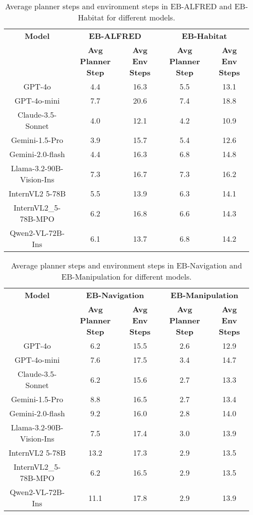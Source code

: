 \begin{table}[th]
    \centering
    \renewcommand{\arraystretch}{1.2}  %
    \begin{tabular}{c|cccc}  
    \toprule
    \textbf{Model} & \multicolumn{2}{c}{\textbf{EB-ALFRED}} & \multicolumn{2}{c}{\textbf{EB-Habitat}} \\
    \cmidrule(lr){2-5} 
    & \textbf{Avg Planner Step} & \textbf{Avg Env Steps} & \textbf{Avg Planner Step} & \textbf{Avg Env Steps} \\
    \midrule
    GPT-4o  & 4.4  & 16.3 & 5.5 & 13.1 \\
    GPT-4o-mini & 7.7  & 20.6 & 7.4 & 18.8 \\
    Claude-3.5-Sonnet  & 4.0  & 12.1 & 4.2 & 10.9 \\
    Gemini-1.5-Pro & 3.9  & 15.7  &  5.4 & 12.6 \\
    Gemini-2.0-flash & 4.4  & 16.3 & 6.8 & 14.8 \\
    Llama-3.2-90B-Vision-Ins & 7.3  & 16.7 & 7.3 & 16.2 \\
    InternVL2 5-78B & 5.5  & 13.9 & 6.3 & 14.1 \\
    InternVL2\_5-78B-MPO & 6.2 & 16.8 & 6.6 & 14.3 \\
    Qwen2-VL-72B-Ins & 6.1  & 13.7 & 6.8  & 14.2  \\
    \bottomrule
    \end{tabular}
    \caption{Average planner steps and environment steps in EB-ALFRED and EB-Habitat for different models.}
    \label{tab:high_env_steps}
\end{table}

\begin{table}[th]
    \centering
    \renewcommand{\arraystretch}{1.2}  %
    \begin{tabular}{c|cccc}  
    \toprule
    \textbf{Model} & \multicolumn{2}{c}{\textbf{EB-Navigation}} & \multicolumn{2}{c}{\textbf{EB-Manipulation}} \\
    \cmidrule(lr){2-5} 
    & \textbf{Avg Planner Step} & \textbf{Avg Env Steps} & \textbf{Avg Planner Step} & \textbf{Avg Env Steps} \\
    \midrule
    GPT-4o & 6.2 & 15.5 & 2.6  & 12.9 \\
    GPT-4o-mini & 7.6 & 17.5 & 3.4  & 14.7 \\
    Claude-3.5-Sonnet & 6.2 & 15.6 & 2.7  & 13.3 \\
    Gemini-1.5-Pro & 8.8 & 16.5 & 2.7  & 13.4 \\
    Gemini-2.0-flash &9.2 & 16.0 & 2.8  & 14.0 \\
    Llama-3.2-90B-Vision-Ins & 7.5 & 17.4 & 3.0 & 13.9 \\
    InternVL2 5-78B & 13.2 & 17.3 & 2.9 & 13.5 \\
    InternVL2\_5-78B-MPO &6.2 &16.5 & 2.9 & 13.5 \\
    Qwen2-VL-72B-Ins &11.1 & 17.8 & 2.9 & 13.9 \\
    \bottomrule
    \end{tabular}
    \caption{Average planner steps and environment steps in EB-Navigation and EB-Manipulation for different models.}
    \label{tab:low_env_steps}
\end{table}

